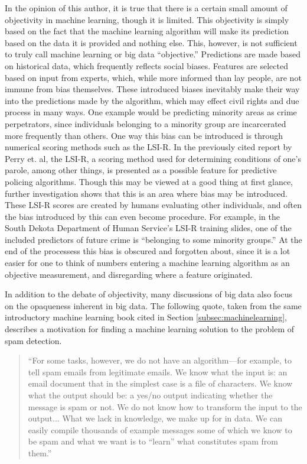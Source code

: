 \documentclass[12pt]{article} %
\begin{document}
In the opinion of this author, it is true that there is a certain small amount of objectivity in machine learning, though it is limited. This objectivity is simply based on the fact that the machine learning algorithm will make its prediction based on the data it is provided and nothing else. This, however, is not sufficient to truly call machine learning or big data ``objective.'' Predictions are made based on historical data, which frequently reflects social biases. Features are selected based on input from experts, which, while more informed than lay people, are not immune from bias themselves. These introduced biases inevitably make their way into the predictions made by the algorithm, which may effect civil rights and due process in many ways. One example would be predicting minority areas as crime perpetrators, since individuals belonging to a minority group are incarcerated more frequently than others. \cite{naacp} One way this bias can be introduced is through numerical scoring methods such as the LSI-R. In the previously cited report by Perry et. al, the LSI-R, a scoring method used for determining conditions of one's parole, among other things, is presented as a possible feature for predictive policing algorithms. Though this may be viewed at a good thing at first glance, further investigation shows that this is an area where bias may be introduced. These LSI-R scores are created by humans evaluating other individuals, and often the bias introduced by this can even become procedure. For example, in the South Dekota Department of Human Service's LSI-R training slides, one of the included predictors of future crime is ``belonging to some minority groups.'' \cite{dekota} At the end of the processess this bias is obscured and forgotten about, since it is a lot easier for one to think of numbers entering a machine learning algorithm as an objective measurement, and disregarding where a feature originated.

In addition to the debate of objectivity, many discussions of big data also focus on the opaqueness inherent in big data.\cite{pasquale2015black} The following quote, taken from the same introductory machine learning book cited in Section \ref{subsec:machinelearning}, describes a motivation for finding a machine learning solution to the problem of spam detection. \cite{introduction}
\begin{quote}
``For some tasks, however, we do not have an algorithm—for example,
to tell spam emails from legitimate emails.  We know what the input is:
an email document that in the simplest case is a file of characters.  We
know what the output should be: a yes/no output indicating whether the
message is spam or not.  We do not know how to transform the input
to the output... 
What we lack in  knowledge,  we make up for in  data.   We can  easily
compile thousands of example messages some of which we know to be
spam and what we want is to ``learn'' what constitutes spam from them.''
\end{quote} 
\end{document}
